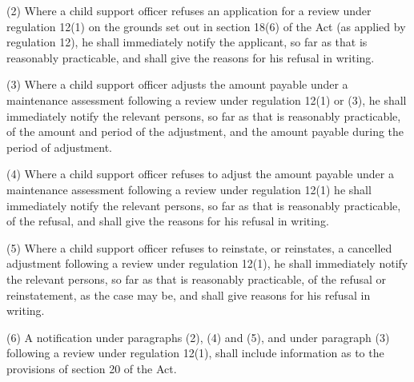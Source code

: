 \documentclass[a4paper]{article}
\begin{document}
(2) Where a child support officer refuses an application for a review under regulation 12(1) 
on the grounds set out in section 18(6) of the Act (as applied by regulation 12), he shall immediately notify the applicant, so far as that is reasonably practicable, and shall give the reasons for his refusal in writing.

(3) Where a child support officer adjusts the amount payable under a maintenance assessment following a review under regulation 12(1) 
or (3),  %
he shall immediately notify the relevant persons, so far as that is reasonably practicable, of the amount and period of the adjustment, and the amount payable during the period of adjustment.

(4) Where a child support officer refuses to adjust the amount payable under a maintenance assessment following a review under regulation 12(1) he shall immediately notify the relevant persons, so far as that is reasonably practicable, of the refusal, and shall give the reasons for his refusal in writing.


(5) Where a child support officer refuses to reinstate, or reinstates, a cancelled adjustment following a review under regulation 12(1), he shall immediately notify the relevant persons, so far as that is reasonably practicable, of the refusal or reinstatement, as the case may be, and shall give reasons for his refusal in writing.


(6) A notification under paragraphs (2), (4) and (5), and under paragraph (3) following a review under regulation 12(1), shall include information as to the provisions of section 20 of the Act.
\end{document}

